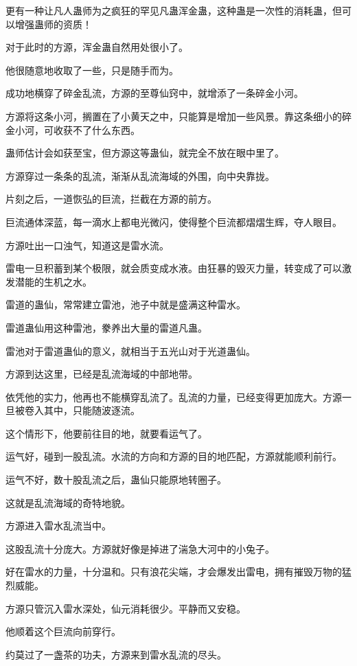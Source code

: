 \begin{this_body}
更有一种让凡人蛊师为之疯狂的罕见凡蛊浑金蛊，这种蛊是一次性的消耗蛊，但可以增强蛊师的资质！

对于此时的方源，浑金蛊自然用处很小了。

他很随意地收取了一些，只是随手而为。

成功地横穿了碎金乱流，方源的至尊仙窍中，就增添了一条碎金小河。

方源将这条小河，搁置在了小黄天之中，只能算是增加一些风景。靠这条细小的碎金小河，可收获不了什么东西。

蛊师估计会如获至宝，但方源这等蛊仙，就完全不放在眼中里了。

方源穿过一条条的乱流，渐渐从乱流海域的外围，向中央靠拢。

片刻之后，一道恢弘的巨流，拦截在方源的前方。

巨流通体深蓝，每一滴水上都电光微闪，使得整个巨流都熠熠生辉，夺人眼目。

方源吐出一口浊气，知道这是雷水流。

雷电一旦积蓄到某个极限，就会质变成水液。由狂暴的毁灭力量，转变成了可以激发潜能的生机之水。

雷道的蛊仙，常常建立雷池，池子中就是盛满这种雷水。

雷道蛊仙用这种雷池，豢养出大量的雷道凡蛊。

雷池对于雷道蛊仙的意义，就相当于五光山对于光道蛊仙。

方源到达这里，已经是乱流海域的中部地带。

依凭他的实力，他再也不能横穿乱流了。乱流的力量，已经变得更加庞大。方源一旦被卷入其中，只能随波逐流。

这个情形下，他要前往目的地，就要看运气了。

运气好，碰到一股乱流。水流的方向和方源的目的地匹配，方源就能顺利前行。

运气不好，数十股乱流之后，蛊仙只能原地转圈子。

这就是乱流海域的奇特地貌。

方源进入雷水乱流当中。

这股乱流十分庞大。方源就好像是掉进了湍急大河中的小兔子。

好在雷水的力量，十分温和。只有浪花尖端，才会爆发出雷电，拥有摧毁万物的猛烈威能。

方源只管沉入雷水深处，仙元消耗很少。平静而又安稳。

他顺着这个巨流向前穿行。

约莫过了一盏茶的功夫，方源来到雷水乱流的尽头。


\end{this_body}
